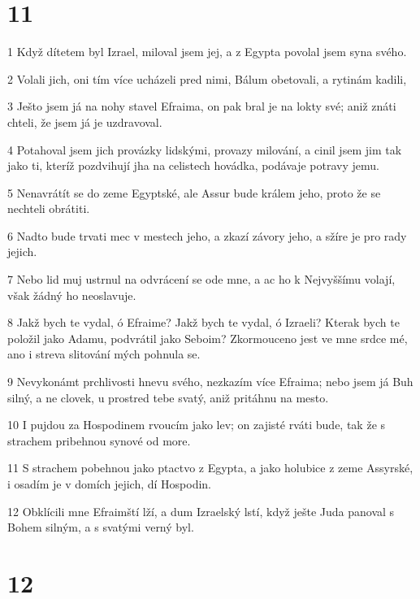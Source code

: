 \chapter{11}

\par 1 Když dítetem byl Izrael, miloval jsem jej, a z Egypta povolal jsem syna svého.
\par 2 Volali jich, oni tím více ucházeli pred nimi, Bálum obetovali, a rytinám kadili,
\par 3 Ješto jsem já na nohy stavel Efraima, on pak bral je na lokty své; aniž znáti chteli, že jsem já je uzdravoval.
\par 4 Potahoval jsem jich provázky lidskými, provazy milování, a cinil jsem jim tak jako ti, kteríž pozdvihují jha na celistech hovádka, podávaje potravy jemu.
\par 5 Nenavrátít se do zeme Egyptské, ale Assur bude králem jeho, proto že se nechteli obrátiti.
\par 6 Nadto bude trvati mec v mestech jeho, a zkazí závory jeho, a sžíre je pro rady jejich.
\par 7 Nebo lid muj ustrnul na odvrácení se ode mne, a ac ho k Nejvyššímu volají, však žádný ho neoslavuje.
\par 8 Jakž bych te vydal, ó Efraime? Jakž bych te vydal, ó Izraeli? Kterak bych te položil jako Adamu, podvrátil jako Seboim? Zkormouceno jest ve mne srdce mé, ano i streva slitování mých pohnula se.
\par 9 Nevykonámt prchlivosti hnevu svého, nezkazím více Efraima; nebo jsem já Buh silný, a ne clovek, u prostred tebe svatý, aniž pritáhnu na mesto.
\par 10 I pujdou za Hospodinem rvoucím jako lev; on zajisté rváti bude, tak že s strachem pribehnou synové od more.
\par 11 S strachem pobehnou jako ptactvo z Egypta, a jako holubice z zeme Assyrské, i osadím je v domích jejich, dí Hospodin.
\par 12 Obklícili mne Efraimští lží, a dum Izraelský lstí, když ješte Juda panoval s Bohem silným, a s svatými verný byl.

\chapter{12}

